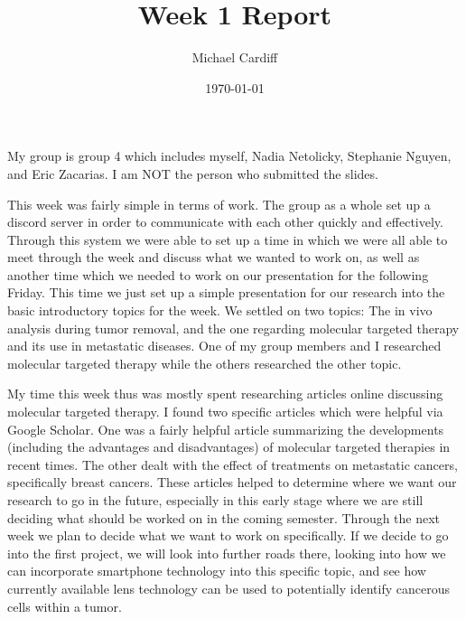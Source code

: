 \documentclass[12pt]{article}
\title{\vspace{-3em}Week 1 Report}
\author{Michael Cardiff}
\date{\today}
\begin{document}
\maketitle
My group is group 4 which includes myself, Nadia Netolicky, Stephanie Nguyen, and Eric Zacarias. I am NOT the person who submitted the slides. 

This week was fairly simple in terms of work. The group as a whole set up a discord server in order to communicate with each other quickly and effectively. Through this system we were able to set up a time in which we were all able to meet through the week and discuss what we wanted to work on, as well as another time which we needed to work on our presentation for the following Friday. This time we just set up a simple presentation for our research into the basic introductory topics for the week. We settled on two topics: The in vivo analysis during tumor removal, and the one regarding molecular targeted therapy and its use in metastatic diseases. One of my group members and I researched molecular targeted therapy while the others researched the other topic.

My time this week thus was mostly spent researching articles online discussing molecular targeted therapy. I found two specific articles which were helpful via Google Scholar. One was a fairly helpful article summarizing the developments (including the advantages and disadvantages) of molecular targeted therapies in recent times. The other dealt with the effect of treatments on metastatic cancers, specifically breast cancers. These articles helped to determine where we want our research to go in the future, especially in this early stage where we are still deciding what should be worked on in the coming semester. Through the next week we plan to decide what we want to work on specifically. If we decide to go into the first project, we will look into further roads there, looking into how we can incorporate smartphone technology into this specific topic, and see how currently available lens technology can be used to potentially identify cancerous cells within a tumor. 
\end{document}
